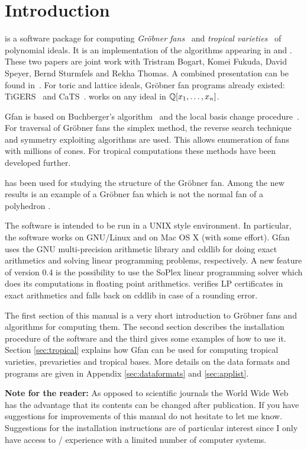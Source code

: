 \section{Introduction}
 \name is a software package for computing \emph{Gr\"obner
 fans}~\cite{MoRo} and \emph{tropical varieties}~\cite{tropgrass} of
 polynomial ideals. It is an implementation of the algorithms
 appearing in \cite{fukuda} and \cite{ctv}. These two papers are joint
 work with Tristram Bogart, Komei Fukuda, David Speyer, Bernd
 Sturmfels and Rekha Thomas. A combined presentation can be found
 in~\cite{thesis}. For toric and lattice ideals, Gr\"obner fan programs
 already existed: TiGERS~\cite{huber} and CaTS~\cite{cats}. \name
 works on any ideal in $\mathbb{Q}[x_1,\dots,x_n]$.

 Gfan is based on Buchberger's algorithm~\cite{Buch} and the local basis
 change procedure~\cite{collart}. For traversal of Gr\"obner fans the simplex method, the reverse
 search technique \cite{avis} and symmetry exploiting algorithms
 are used. This allows enumeration of fans with millions of
 cones. For tropical computations these methods have been developed further.

\name has been used for studying the structure of the
 Gr\"obner fan. Among the new results is an example of a Gr\"obner fan
 which is not the normal fan of a polyhedron \cite{jensen}.

The software is intended to be run in a UNIX style environment. In
particular, the software works on GNU/Linux and on
Mac OS X (with some effort).  Gfan uses the GNU multi-precision
arithmetic library
\cite{gmp} and cddlib \cite{cdd} for doing exact arithmetics and
solving linear programming problems, respectively. A new feature of
version 0.4 is the possibility to use the SoPlex \cite{wunderling}
linear programming solver which does its computations in floating
point arithmetics. \name verifies LP certificates in exact arithmetics
and falls back on cddlib in case of a rounding error.

The first section of this manual is a very short introduction to
Gr\"obner fans and algorithms for computing them. The second section
describes the installation procedure of the software and the third
gives some examples of how to use it. Section \ref{sec:tropical}
explains how Gfan can be used for computing tropical varieties,
prevarieties and tropical bases. More details on the data formats and
programs are given in Appendix \ref{sec:dataformats} and
\ref{sec:applist}.

{\bf Note for the reader:} As opposed to scientific journals the World
Wide Web has the advantage that its contents can be changed after
publication. If you have suggestions for improvements of this manual
do not hesitate to let me know. Suggestions for the installation
instructions are of particular interest since I only have access to /
experience with a limited number of computer systems.


